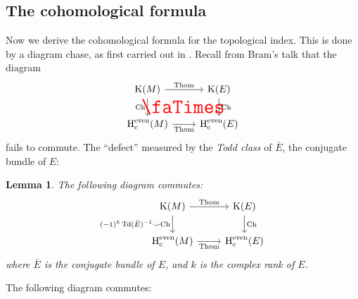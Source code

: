 \documentclass[reqno]{scrartcl}
\newtheorem{lemma}[theorem]{Lemma}
\theoremstyle{definition}
\theoremstyle{remark}
\newcommand{\tind}{\operatorname{t-ind}}
\newcommand{\Hc}{\operatorname{H}_{\mathrm{c}}} %
\newcommand{\Thom}{\text{Thom}}
\renewcommand{\cup}{\smile}
\begin{document}
\subsection{The cohomological formula}
Now we derive the cohomological formula for the topological index. This is done by a diagram chase, as first carried out in \cite{atiyahsinger3}. Recall from Bram's talk that the diagram
\[ \begin{tikzcd}
\K(M) \arrow[d, "\Ch"'] \arrow[r, "\Thom"] \arrow[rd, "{\text{\huge\red\faTimes}}", phantom] & \K(E) \arrow[d, "\Ch"] \\
\Hc^\even(M) \arrow[r, "\Thom"']           & \Hc^\even(E)          
\end{tikzcd} \]
fails to commute. The ``defect'' measured by the \emph{Todd class} of $\bar{E}$, the conjugate bundle of $E$:
\begin{lemma}
The following diagram commutes:
\[ \begin{tikzcd}
\K(M) \arrow[d, "(-1)^k\Td(\bar{E})^{-1}\cup\Ch"'] \arrow[r, "\Thom"] & \K(E) \arrow[d, "\Ch"] \\
\Hc^\even(M) \arrow[r, "\Thom"']                                      & \Hc^\even(E)          
\end{tikzcd} \]
where $\bar{E}$ is the conjugate bundle of $E$, and $k$ is the \emph{complex} rank of $E$.
\end{lemma}

The following diagram commutes:

\hspace{-5em}
\end{document}
